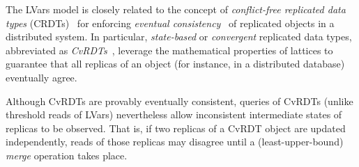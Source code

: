 The LVars model is closely related to the concept of
\emph{conflict-free replicated data types} (CRDTs)~\cite{crdts} for
enforcing \emph{eventual consistency}~\cite{vogels-ec} of replicated
objects in a distributed system.  In particular, \emph{state-based} or
\emph{convergent} replicated data types, abbreviated as
\emph{CvRDTs}~\cite{crdts, crdts-tr}, leverage the mathematical
properties of lattices to guarantee that all replicas of an object
(for instance, in a distributed database) eventually agree.

Although CvRDTs are provably eventually consistent, queries of CvRDTs
(unlike threshold reads of LVars) nevertheless allow inconsistent
intermediate states of replicas to be observed.  That is, if two
replicas of a CvRDT object are updated independently, reads of those
replicas may disagree until a (least-upper-bound) \emph{merge}
operation takes place.

